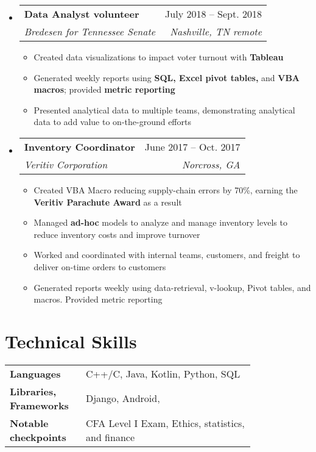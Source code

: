 \documentclass[letterpaper]{article}
\makeatletter
\newcommand{\resumeItem}[1]{
  \item\small{
    {#1 \vspace{-2pt}}
  }
}
\newcommand{\resumeSubheading}[4]{
  \vspace{-2pt}\item
    \begin{tabular*}{0.97\textwidth}[t]{l@{\extracolsep{\fill}}r}
      \textbf{#1} & #2 \\
      \textit{\small#3} & \textit{\small #4} \\
    \end{tabular*}\vspace{-7pt}
}
\newcommand{\resumeSubSubheading}[2]{
    \item
    \begin{tabular*}{0.97\textwidth}{l@{\extracolsep{\fill}}r}
      \textit{\small#1} & \textit{\small #2} \\
    \end{tabular*}\vspace{-7pt}
}
\newcommand{\resumeSubHeadingListStart}{\begin{itemize}[leftmargin=0.15in, label={}]}
\newcommand{\resumeSubHeadingListEnd}{\end{itemize}}
\newcommand{\resumeItemListStart}{\begin{itemize}}
\newcommand{\resumeItemListEnd}{\end{itemize}\vspace{-5pt}}
\makeatother
\begin{document}
\resumeSubHeadingListStart
  \resumeSubheading
    {Data Analyst volunteer}{July 2018 -- Sept. 2018}
    {Bredesen for Tennessee Senate}{Nashville, TN remote}
    \resumeItemListStart
      \resumeItem{Created data visualizations to impact voter turnout with \textbf{Tableau}}
      \resumeItem{Generated weekly reports using \textbf{SQL, Excel pivot tables, } and \textbf{VBA macros}; provided \textbf{metric reporting}}
      \resumeItem{Presented analytical data to multiple teams, demonstrating analytical data to add value to on-the-ground efforts}
    \resumeItemListEnd
\resumeSubHeadingListEnd

\resumeSubHeadingListStart
  \resumeSubheading
    {Inventory Coordinator}{June 2017 -- Oct. 2017}
    {Veritiv Corporation}{Norcross, GA}
    \resumeItemListStart
      \resumeItem{Created VBA Macro reducing supply-chain errors by 70\%, earning the \textbf{Veritiv Parachute Award} as a result}
      \resumeItem{Managed \textbf{ad-hoc} models to analyze and manage inventory levels to reduce inventory costs and improve turnover}
      \resumeItem{Worked and coordinated with internal teams, customers, and freight to deliver on-time orders to customers}
      \resumeItem{Generated reports weekly using data-retrieval, v-lookup, Pivot tables, and macros. Provided metric reporting}
    \resumeItemListEnd
\resumeSubHeadingListEnd



\section{Technical Skills}
\vspace{-6pt}
\begin{table}[h]
    \centering
    \begin{tabular}{L{0.2\linewidth} L{0.6\linewidth}}
        \textbf{Languages} & C++/C, Java, Kotlin, Python, SQL \\
        \textbf{Libraries, Frameworks} & Django, Android, \\
        \textbf{Notable checkpoints} & CFA Level I Exam, Ethics, statistics, and finance
    \end{tabular}
\end{table}
\vspace{12mm}
\end{document}
